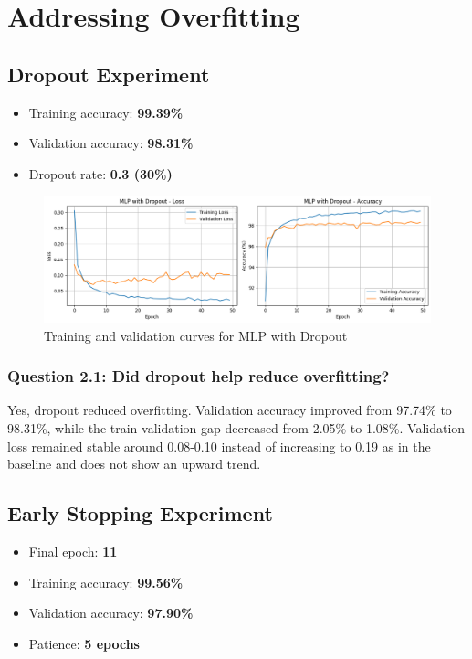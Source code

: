 \section{Addressing Overfitting}

\subsection{Dropout Experiment}

\begin{itemize}
    \item Training accuracy: \textbf{99.39\%}
    \item Validation accuracy: \textbf{98.31\%}
    \item Dropout rate: \textbf{0.3 (30\%)}
\end{itemize}

\begin{figure}[h]
    \centering
    \includegraphics[width=0.7\linewidth]{section2/dropout.png}
    \caption{Training and validation curves for MLP with Dropout}
    \label{fig:dropout}
\end{figure}

\subsubsection{Question 2.1: Did dropout help reduce overfitting?}
Yes, dropout reduced overfitting. Validation accuracy improved from 97.74\% to 98.31\%, while the train-validation gap decreased from 2.05\% to 1.08\%. Validation loss remained stable around 0.08-0.10 instead of increasing to 0.19 as in the baseline and does not show an upward trend.

\subsection{Early Stopping Experiment}

\begin{itemize}
    \item Final epoch: \textbf{11}
    \item Training accuracy: \textbf{99.56\%}
    \item Validation accuracy: \textbf{97.90\%}
    \item Patience: \textbf{5 epochs}
\end{itemize}

